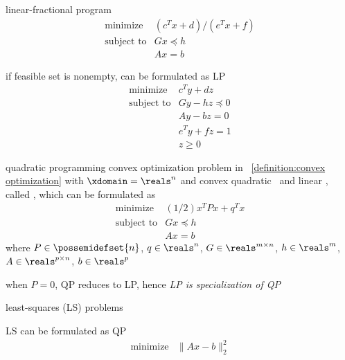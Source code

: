\documentclass[17pt,landscape]{foils}
\begin{document}
{\item
	linear-fractional program
	$$
		\begin{array}{ll}
			\mbox{minimize} &
				(
				c^T x + d
				)
				/
				(
				e^T x + f
				)
			\\
			\mbox{subject to} &
				Gx \preceq h
			\\ &
				Ax = b
		\end{array}
	$$
	\bit
	\item
		if feasible set is nonempty,
		can be formulated as LP
		$$
			\begin{array}{ll}
				\mbox{minimize} &
					c^T y + dz
				\\
				\mbox{subject to} &
					Gy - hz \preceq0
				\\ &
					Ay-bz = 0
				\\ &
					e^Ty + fz = 1
				\\ &
					z\geq0
			\end{array}
		$$
	\eit
\eit



\begin{mydefinition}{quadratic programming}
	convex optimization problem in ~\ref{definition:convex optimization}
	with
	$\xdomain=\reals^n$ and
	convex quadratic \fobj\ and linear \fie,
	called ,
	which can be formulated as
	$$
		\begin{array}{ll}
			\mbox{minimize}
				& (1/2) x^TPx + q^Tx
			\\
			\mbox{subject to}
				& Gx \preceq h
			\\
				& A x =b
		\end{array}
	$$
	where
		$P\in\possemidefset{n}$, $q\in\reals^n$,
		$G\in\reals^{m\times n}$, $h\in\reals^m$,
		$A\in\reals^{p\times n}$, $b\in\reals^p$
\end{mydefinition}

\bit
\item
	when $P=0$, QP reduces to LP,
	hence \emph{LP is specialization of QP}
\eit



\bit
\item
	least-squares (LS) problems
	\bit
	\item
		LS can be formulated as QP
		$$
			\begin{array}{ll}
				\mbox{minimize} &
					\|Ax-b\|_2^2
			\end{array}
		$$
	\eit

}
\end{document}
